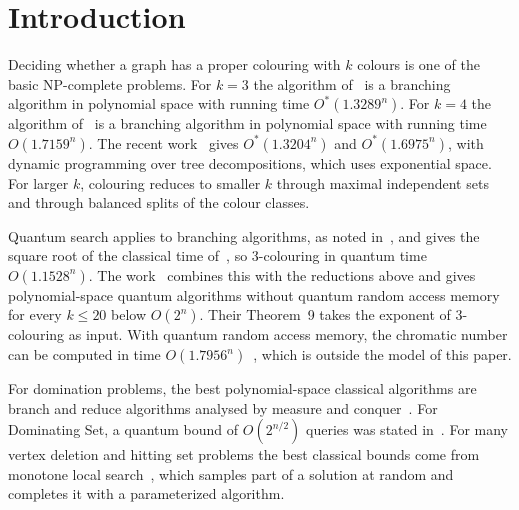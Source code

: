 \documentclass[11pt]{article}
\theoremstyle{remark}
\begin{document}
\section{Introduction}

Deciding whether a graph has a proper colouring with $k$ colours is one of the basic NP-complete problems. For $k = 3$ the algorithm of~\cite{BE05} is a branching algorithm in polynomial space with running time $O^*(1.3289^n)$. For $k = 4$ the algorithm of~\cite{WGJ24} is a branching algorithm in polynomial space with running time $O(1.7159^n)$. The recent work~\cite{YS26} gives $O^*(1.3204^n)$ and $O^*(1.6975^n)$, with dynamic programming over tree decompositions, which uses exponential space. For larger $k$, colouring reduces to smaller $k$ through maximal independent sets~\cite{Law76,Bys04} and through balanced splits of the colour classes.

Quantum search applies to branching algorithms, as noted in~\cite{Fur08}, and gives the square root of the classical time of~\cite{BE05}, so 3-colouring in quantum time $O(1.1528^n)$. The work~\cite{SM22} combines this with the reductions above and gives polynomial-space quantum algorithms without quantum random access memory for every $k \le 20$ below $O(2^n)$. Their Theorem~9 takes the exponent of 3-colouring as input. With quantum random access memory, the chromatic number can be computed in time $O(1.7956^n)$~\cite{GL24}, which is outside the model of this paper.

For domination problems, the best polynomial-space classical algorithms are branch and reduce algorithms analysed by measure and conquer~\cite{RB11,RB12,BEP10,BDEP13,Iwa11,XN14}. For Dominating Set, a quantum bound of $O(2^{n/2})$ queries was stated in~\cite{WCCV23}. For many vertex deletion and hitting set problems the best classical bounds come from monotone local search~\cite{FGLS19}, which samples part of a solution at random and completes it with a parameterized algorithm.
\end{document}
